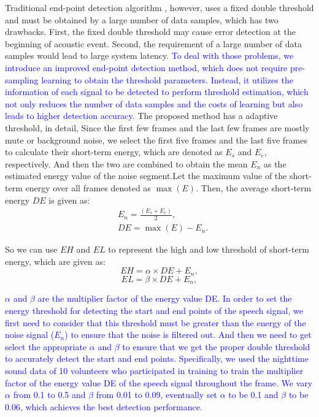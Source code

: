 Traditional end-point detection algorithm \cite{stowell2015detection}, however, uses a fixed double threshold and must be obtained by a large number of data samples, which has two drawbacks. First, the fixed double threshold may cause error detection at the beginning of acoustic event. Second, the requirement of a large number of data samples would lead to large system latency. \textcolor{blue}{To deal with those problems, we introduce an improved end-point detection method, which does not require pre-sampling learning to obtain the threshold parameters. Instead, it utilizes the information of each signal to be detected to perform threshold estimation, which not only reduces the number of data samples and the costs of learning but also leads to higher detection accuracy.} The proposed method has a adaptive threshold, in detail, Since the first few frames and the last few frames are mostly mute or background noise, we select the first five frames and the last five frames to calculate their short-term energy, which are denoted as $E_s$ and $E_e$, respectively. And then the two are combined to obtain the mean $E_n$ as the estimated energy value of the noise segment.Let the maximum value of the short-term energy over all frames denoted as $\max (E)$. Then, the average short-term energy $DE$ is given as:
\begin{eqnarray}
      &E_n = \frac{(E_s+E_e)}{2}, \\
      &DE = \max (E)-E_n.\label{eq:DE}
\end{eqnarray}

So we can use $EH$ and $EL$ to represent the high and low threshold of short-term energy, which are given as:
\begin{equation}
      EH=\alpha \times DE+E_n,
\end{equation}
\begin{equation}
    EL=\beta \times DE+E_n,
\end{equation}

 \textcolor{blue}{$\alpha$ and $\beta$ are the multiplier factor of the energy value DE. In order to set the energy threshold for detecting the start and end points of the speech signal, we first need to consider that this threshold must be greater than the energy of the noise signal ($E_n$) to ensure that the noise is filtered out. And then we need to get select the appropriate $\alpha$ and $\beta$ to ensure that we get the proper double threshold to accurately detect the start and end points. Specifically, we used the nighttime sound data of 10 volunteers who participated in training to train the multiplier factor of the energy value DE of the speech signal throughout the frame. We vary $\alpha$ from 0.1 to 0.5 and $\beta$ from 0.01 to 0.09, eventually set $\alpha$ to be 0.1 and $\beta$ to be 0.06, which achieves the best detection performance.}

